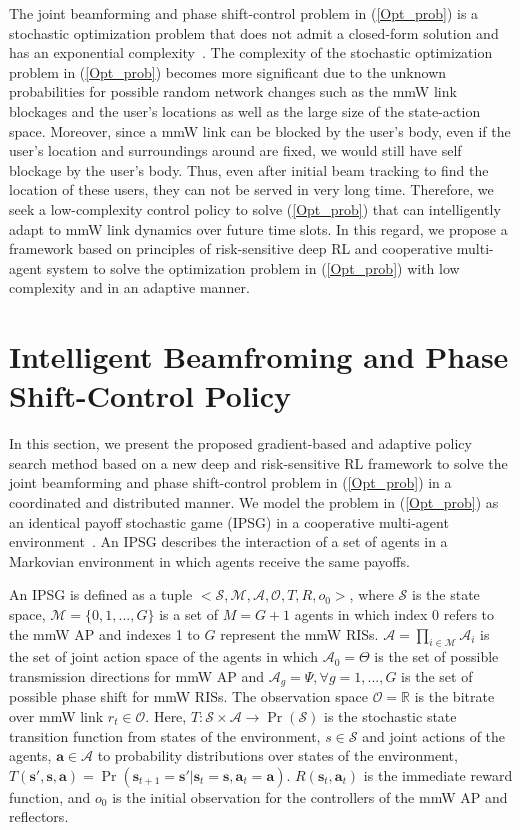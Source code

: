 \documentclass[conference]{IEEEtran}
\begin{document}
The joint beamforming and phase shift-control problem in (\ref{Opt_prob}) is a stochastic optimization problem that does not admit a closed-form solution and has an exponential complexity~\cite{Sutton2018}. The complexity of the stochastic optimization problem in (\ref{Opt_prob}) becomes more significant due to the unknown probabilities for possible random network changes such as the mmW link blockages and the user's locations\cite{Sutton2018} as well as the large size of the state-action space. Moreover, since a mmW link can be blocked by the user's body, even if the user's location and surroundings around are fixed, we would still have self blockage by the user's body. Thus, even after initial beam tracking to find the location of these users, they can not be served in very long time. Therefore, we seek a low-complexity control policy to solve (\ref{Opt_prob}) that can intelligently  adapt to mmW link dynamics over future time slots. In this regard, we propose a framework based on principles of risk-sensitive deep RL and cooperative multi-agent system to solve the optimization problem in (\ref{Opt_prob}) with low complexity and in an adaptive manner.
\vspace{-0.8cm}
\section{Intelligent Beamfroming and Phase Shift-Control Policy}\label{Sec:Algorithm}
In this section, we present the proposed gradient-based and adaptive policy search method based on a new deep and risk-sensitive RL framework to solve the joint beamforming and phase shift-control problem in (\ref{Opt_prob}) in a coordinated and distributed manner. We model the problem in (\ref{Opt_prob}) as an identical payoff stochastic game (IPSG) in a cooperative multi-agent environment~\cite{Walidbook2000}. An IPSG describes the interaction of a set of agents in a Markovian environment in which agents receive the same payoffs\cite{Polecy2000}.

An IPSG is defined as a tuple $<\mathcal{S},\mathcal{M},\mathcal{A},\mathcal{O},T,R,o_0>$, where $\mathcal{S}$ is the state space, $\mathcal{M}=\{0,1,...,G\}$ is a set of $M=G+1$ agents in which index $0$ refers to the mmW AP and indexes 1 to $G$ represent the mmW RISs. $\mathcal{A}=\prod_{i \in \mathcal{M}} \mathcal{A}_i$ is the set of joint action space of the agents in which $\mathcal{A}_0=\Theta$ is the set of possible transmission directions for mmW AP and $\mathcal{A}_g=\Psi,\forall g=1,...,G$ is the set of possible phase shift for mmW RISs. The observation space $\mathcal{O}=\mathbb{R}$ is the bitrate over mmW link $r_{t}\in\mathcal{O}$. Here, $T:\mathcal{S} \times \mathcal{A}\rightarrow \Pr(\mathcal{S})$ is the stochastic state transition function from states of the environment, $s \in \mathcal{S}$ and joint actions of the agents, $\boldsymbol{a}\in \mathcal{A}$ to probability distributions over states of the environment, $T(\boldsymbol{s}',\boldsymbol{s},\boldsymbol{a}) = \Pr(\boldsymbol{s}_{t+1}= \boldsymbol{s}'|\boldsymbol{s}_t = \boldsymbol{s}, \boldsymbol{a}_t = \boldsymbol{a})$. $R(\boldsymbol{s}_t, \boldsymbol{a}_t)$ is the immediate reward function, and $o_0$ is the initial observation for the controllers of the mmW AP and reflectors\cite{three}.
\end{document}
